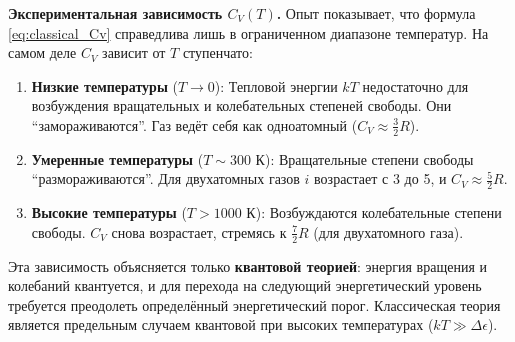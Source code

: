 \begin{remark}
\textbf{Экспериментальная зависимость $C_V(T)$.} Опыт показывает, что формула \eqref{eq:classical_Cv} справедлива лишь в ограниченном диапазоне температур. На самом деле $C_V$ зависит от $T$ ступенчато:
\begin{enumerate}
    \item \textbf{Низкие температуры} ($T \to 0$): Тепловой энергии $kT$ недостаточно для возбуждения вращательных и колебательных степеней свободы. Они ``замораживаются''. Газ ведёт себя как одноатомный ($C_V \approx \frac{3}{2}R$).
    \item \textbf{Умеренные температуры} ($T \sim 300$ К): Вращательные степени свободы ``размораживаются''. Для двухатомных газов $i$ возрастает с 3 до 5, и $C_V \approx \frac{5}{2}R$.
    \item \textbf{Высокие температуры} ($T > 1000$ К): Возбуждаются колебательные степени свободы. $C_V$ снова возрастает, стремясь к $\frac{7}{2}R$ (для двухатомного газа).
\end{enumerate}
Эта зависимость объясняется только \textbf{квантовой теорией}: энергия вращения и колебаний квантуется, и для перехода на следующий энергетический уровень требуется преодолеть определённый энергетический порог. Классическая теория является предельным случаем квантовой при высоких температурах ($kT \gg \Delta \epsilon$).
\end{remark}
